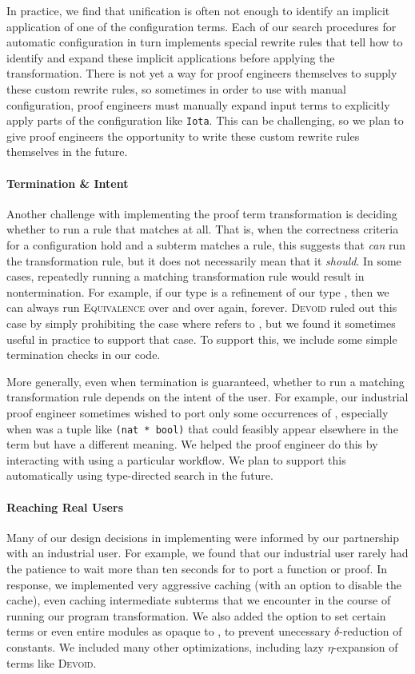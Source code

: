 In practice, we find that unification is often not enough to identify an implicit application of one of the configuration terms.
Each of our search procedures for automatic configuration in turn implements special rewrite rules that tell \toolname
how to identify and expand these implicit applications before applying the transformation.
There is not yet a way for proof engineers themselves to supply these custom rewrite rules,
so sometimes in order to use \toolname with manual configuration, proof engineers must manually expand
input terms to explicitly apply parts of the configuration like \lstinline{Iota}.
This can be challenging, so we plan to give proof engineers the opportunity to write
these custom rewrite rules themselves in the future.

\paragraph{Termination \& Intent}

Another challenge with implementing the proof term transformation is deciding whether to run a rule that matches at all.
That is, when the correctness criteria for a configuration hold and a subterm matches a rule, this suggests that \toolname \textit{can}
run the transformation rule, but it does not necessarily mean that it \textit{should}.
In some cases, repeatedly running a matching transformation rule would result in nontermination.
For example, if our type \B is a refinement of our type \A, then we can always run \textsc{Equivalence}
over and over again, forever.
\textsc{Devoid} ruled out this case by simply prohibiting the case where \B refers to \A, but we found it sometimes
useful in practice to support that case.
To support this, we include some simple termination checks in our code.

More generally, even when termination is guaranteed, whether to run a matching transformation rule
depends on the intent of the user.
For example, our industrial proof engineer sometimes wished to port only some occurrences of \A,
especially when \A was a tuple like \lstinline{(nat * bool)} that could feasibly appear elsewhere in the term
but have a different meaning.
We helped the proof engineer do this by interacting with \toolname using a particular workflow.
We plan to support this automatically using type-directed search in the future.

\paragraph{Reaching Real Users}
Many of our design decisions in implementing \toolname were informed by our partnership with
an industrial user.
For example, we found that our industrial user rarely had the patience to wait more than ten seconds
for \toolname to port a function or proof.
In response, we implemented very aggressive caching (with an option to disable the cache), even caching intermediate subterms that
we encounter in the course of running our program transformation.
We also added the option to set certain terms or even entire modules as opaque to \toolname, to prevent
unecessary $\delta$-reduction of constants.
We included many other optimizations, including lazy $\eta$-expansion of terms like \textsc{Devoid}.

